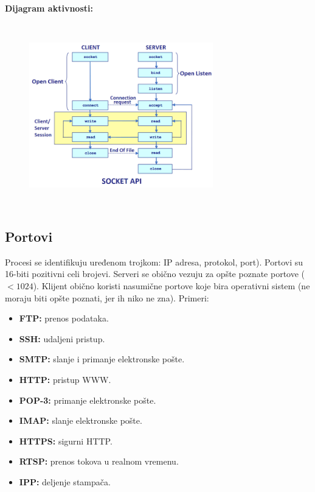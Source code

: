 \documentclass[a4paper]{article}
\begin{document}
    \noindent \textbf{Dijagram aktivnosti:}
    \begin{figure}[H]
        \begin{center}
            \includegraphics[width=80mm,height=80mm]{Slike/socket_api.png}
        \end{center}
    \end{figure}

    \subsection{Portovi}
        Procesi se identifikuju uređenom trojkom: IP adresa, protokol, port). Portovi su 16-biti
        pozitivni celi brojevi. Serveri se obično vezuju za opšte poznate portove ($<1024$).
        Klijent obično koristi nasumične portove koje bira operativni sistem (ne moraju biti
        opšte poznati, jer ih niko ne zna). Primeri:
        \begin{itemize}
            \item \textbf{FTP:} prenos podataka.
            \item \textbf{SSH:} udaljeni pristup.
            \item \textbf{SMTP:} slanje i primanje elektronske pošte.
            \item \textbf{HTTP:} pristup WWW.
            \item \textbf{POP-3:} primanje elektronske pošte.
            \item \textbf{IMAP:} slanje elektronske pošte.
            \item \textbf{HTTPS:} sigurni HTTP.
            \item \textbf{RTSP:} prenos tokova u realnom vremenu.
            \item \textbf{IPP:} deljenje stampača.
        \end{itemize}
\end{document}
